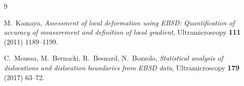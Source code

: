 \documentclass[11pt]{article}
\begin{document}
\begin{thebibliography}{9}

M.~Kamaya,
\emph{Assessment of local deformation using EBSD: Quantification of accuracy of measurement and definition of local gradient},
Ultramicroscopy \textbf{111} (2011) 1189--1199.

C.~Moussa, M.~Bernacki, R.~Besnard, N.~Bozzolo,
\emph{Statistical analysis of dislocations and dislocation boundaries from EBSD data},
Ultramicroscopy \textbf{179} (2017) 63--72.

\end{thebibliography}
\end{document}
